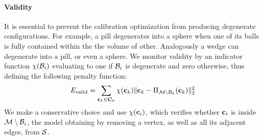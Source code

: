 \paragraph{Validity}
It is essential to prevent the calibration optimization from producing degenerate configurations. For example, a pill degenerates into a sphere when one of its balls is fully contained within the the volume of other. Analogously a wedge can degenerate into a pill, or even a sphere. We monitor validity by an indicator function $\chi(\mathcal{B}_i)$ evaluating to one if $\mathcal{B}_i$ is degenerate and zero otherwise, thus defining the following penalty function:
% 
\begin{equation}
E_{\text{valid}} = \sum_{\mathbf{c}_k \in {\mathbf{C}}_k} \chi(\mathbf{c}_k) \| \mathbf{c}_k - \Pi_{\mathcal{M} \setminus \mathcal{B}_k}(\mathbf{c}_k) \|_2^2
\end{equation}
% 
We make a conservative choice and use $\chi(\mathbf{c}_i)$, which verifies whether $\mathbf{c}_i$ is inside $\mathcal{M} \setminus \mathcal{B}_i$, the model obtaining by removing a vertex, as well as all its adjacent edges, from $\mathcal{S}$. 

